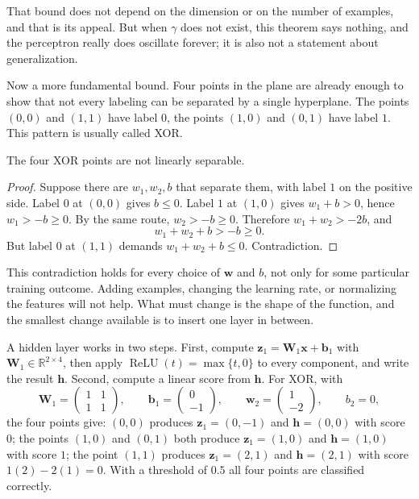 That bound does not depend on the dimension or on the number of examples, and that is its
appeal. But when $\gamma$ does not exist, this theorem says nothing, and the perceptron really
does oscillate forever; it is also not a statement about generalization.

Now a more fundamental bound. Four points in the plane are already enough to show that not every
labeling can be separated by a single hyperplane. The points $(0,0)$ and $(1,1)$ have label $0$,
the points $(1,0)$ and $(0,1)$ have label $1$. This pattern is usually called XOR.

\begin{proposisi}
The four XOR points are not linearly separable.
\end{proposisi}

\begin{proof}
Suppose there are $w_{1},w_{2},b$ that separate them, with label $1$ on the positive side. Label
$0$ at $(0,0)$ gives $b\le0$. Label $1$ at $(1,0)$ gives $w_{1}+b>0$, hence $w_{1}>-b\ge0$. By
the same route, $w_{2}>-b\ge0$. Therefore $w_{1}+w_{2}>-2b$, and
\[
  w_{1}+w_{2}+b>-b\ge0 .
\]
But label $0$ at $(1,1)$ demands $w_{1}+w_{2}+b\le0$. Contradiction.
\end{proof}

This contradiction holds for every choice of $\mathbf{w}$ and $b$, not only for some particular
training outcome. Adding examples, changing the learning rate, or normalizing the features will
not help. What must change is the shape of the function, and the smallest change available is to
insert one layer in between.


A hidden layer works in two steps. First, compute
$\mathbf{z}_{1}=\mathbf{W}_{1}\mathbf{x}+\mathbf{b}_{1}$ with
$\mathbf{W}_{1}\in\mathbb{R}^{2\times4}$, then apply
$\operatorname{ReLU}(t)=\max\{t,0\}$ to every component, and write the result $\mathbf{h}$.
Second, compute a linear score from $\mathbf{h}$. For XOR, with
\[
  \mathbf{W}_{1}=\begin{pmatrix}1&1\\1&1\end{pmatrix},\qquad
  \mathbf{b}_{1}=\begin{pmatrix}0\\-1\end{pmatrix},\qquad
  \mathbf{w}_{2}=\begin{pmatrix}1\\-2\end{pmatrix},\qquad b_{2}=0,
\]
the four points give: $(0,0)$ produces $\mathbf{z}_{1}=(0,-1)$ and $\mathbf{h}=(0,0)$ with score
$0$; the points $(1,0)$ and $(0,1)$ both produce $\mathbf{z}_{1}=(1,0)$ and $\mathbf{h}=(1,0)$
with score $1$; the point $(1,1)$ produces $\mathbf{z}_{1}=(2,1)$ and $\mathbf{h}=(2,1)$ with
score $1(2)-2(1)=0$. With a threshold of $0.5$ all four points are classified correctly.

